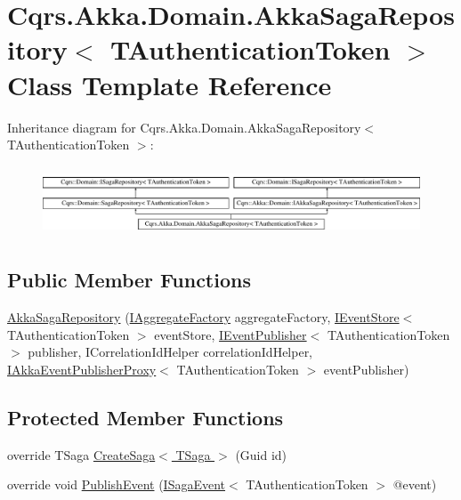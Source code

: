 \hypertarget{classCqrs_1_1Akka_1_1Domain_1_1AkkaSagaRepository}{}\section{Cqrs.\+Akka.\+Domain.\+Akka\+Saga\+Repository$<$ T\+Authentication\+Token $>$ Class Template Reference}
\label{classCqrs_1_1Akka_1_1Domain_1_1AkkaSagaRepository}
Inheritance diagram for Cqrs.\+Akka.\+Domain.\+Akka\+Saga\+Repository$<$ T\+Authentication\+Token $>$\+:\begin{figure}[H]
\begin{center}
\leavevmode
\includegraphics[height=2.105263cm]{classCqrs_1_1Akka_1_1Domain_1_1AkkaSagaRepository}
\end{center}
\end{figure}
\subsection*{Public Member Functions}
\begin{DoxyCompactItemize}
\item 
\hyperlink{classCqrs_1_1Akka_1_1Domain_1_1AkkaSagaRepository_a8297f64e2b7a7be7bcc999c89dcece05}{Akka\+Saga\+Repository} (\hyperlink{interfaceCqrs_1_1Domain_1_1Factories_1_1IAggregateFactory}{I\+Aggregate\+Factory} aggregate\+Factory, \hyperlink{interfaceCqrs_1_1Events_1_1IEventStore}{I\+Event\+Store}$<$ T\+Authentication\+Token $>$ event\+Store, \hyperlink{interfaceCqrs_1_1Events_1_1IEventPublisher}{I\+Event\+Publisher}$<$ T\+Authentication\+Token $>$ publisher, I\+Correlation\+Id\+Helper correlation\+Id\+Helper, \hyperlink{interfaceCqrs_1_1Akka_1_1Events_1_1IAkkaEventPublisherProxy}{I\+Akka\+Event\+Publisher\+Proxy}$<$ T\+Authentication\+Token $>$ event\+Publisher)
\end{DoxyCompactItemize}
\subsection*{Protected Member Functions}
\begin{DoxyCompactItemize}
\item 
override T\+Saga \hyperlink{classCqrs_1_1Akka_1_1Domain_1_1AkkaSagaRepository_a2c7263d0e58d2b31149ec685d5be934a}{Create\+Saga$<$ T\+Saga $>$} (Guid id)
\item 
override void \hyperlink{classCqrs_1_1Akka_1_1Domain_1_1AkkaSagaRepository_a7f6375bb99e680792466fb420232a535}{Publish\+Event} (\hyperlink{interfaceCqrs_1_1Events_1_1ISagaEvent}{I\+Saga\+Event}$<$ T\+Authentication\+Token $>$ @event)
\end{DoxyCompactItemize}
